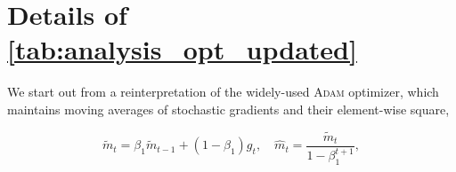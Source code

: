 \documentclass{article}
\theoremstyle{plain}
\theoremstyle{definition}
\theoremstyle{remark}
\begin{document}
\section{Details of \cref{tab:analysis_opt_updated}}
We start out from a reinterpretation of the widely-used \textsc{Adam} optimizer, which maintains moving averages of stochastic gradients and their element-wise square,

\begin{equation}
    \tilde{m}_t = \beta_1 \tilde{m}_{t-1} + (1 - \beta_1) g_t, \quad
    \hat{m}_t = \frac{\tilde{m}_t}{1 - \beta_1^{t+1}},
\end{equation}
\end{document}
